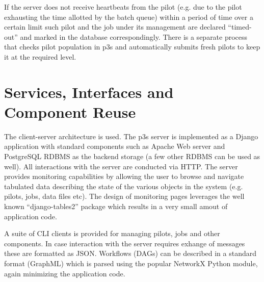 \documentclass{PoS}
\begin{document}
If the server does not receive heartbeats from the pilot (e.g. due to the pilot exhausting the time allotted by the batch queue)
within a period of time over a certain limit such pilot and the job under its management are declared ``timed-out'' and marked
in the database correspondingly. There is a separate process that checks pilot population in p3s and automatically
submits fresh pilots to keep it at the required level.

\section{Services, Interfaces and Component Reuse}

The client-server architecture is used. The p3s server is implemented as a Django \cite{django} application
with standard components such as Apache Web server and PostgreSQL RDBMS as the backend storage
(a few other RDBMS can be used as well). All interactions with the server
are conducted via HTTP. The server provides monitoring capabilities by allowing the user to browse and navigate
tabulated data describing the state of the various objects in the system (e.g. pilots, jobs, data files etc).
The design of monitoring pages leverages the well known ``django-tables2'' package which results
in a very small amout of application code.

A suite of CLI clients is provided for managing pilots, jobs and
other components. In case interaction with the server requires exhange of messages these are
formatted as JSON. Workflows (DAGs) can be described in a standard format (GraphML) which is parsed
using the popular NetworkX Python module, again minimizing the application code.

\end{document}
